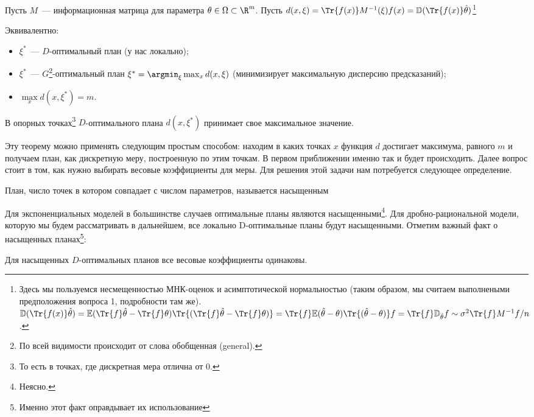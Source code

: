\begin{thm}
Пусть $M$ — информационная матрица для параметра $\theta \in \Omega \subset \R^m$.
Пусть $d(x,\xi) = \Tr{f(x)}M^{-1}(\xi)f(x) = \mathbb D(\Tr{f(x)}\hat{\theta})$\footnote{
    Здесь мы пользуемся несмещенностью МНК-оценок и асимптотической нормальностью (таким образом, мы считаем выполнеными предположения вопроса 1, подробности там же). $\mathbb D(\Tr{f(x)}\hat{\theta}) = \mathbb E(\Tr{f}\hat{\theta} - \Tr{f}\theta)\Tr{(\Tr{f}\hat{\theta} - \Tr{f}\theta)} = \Tr{f}\mathbb E(\hat{\theta} - \theta)\Tr{(\hat{\theta} - \theta)}f = \Tr{f}\mathbb D_{\hat{\theta}}f \sim  \sigma^2\Tr{f}M^{-1}f / n$.}


Эквивалентно:
\begin{itemize}
\item $\xi^{*}$ — $D$-оптимальный план (у нас локально);
\item $\xi^{*}$ — $G$\footnote{По всей видимости происходит от слова обобщенная (general).}-оптимальный план $\xi^{*} = \argmin_{\xi}\max_{x}d(x, \xi)$ (минимизирует максимальную дисперсию предсказаний);
\item $\max\limits_{x} d(x,\xi^{*}) = m$.
\end{itemize}
В опорных точках\footnote{То есть в точках, где дискретная мера отлична от 0.} $D$-оптимального плана  $d(x, \xi^{*})$ принимает свое максимальное значение.
\end{thm}

Эту теорему можно применять следующим простым способом: находим в каких точках $x$ функция $d$ достигает максимума, равного $m$ и получаем план, как дискретную меру, построенную по этим точкам.
В первом приближении именно так и будет происходить. Далее вопрос стоит в том, как нужно выбирать весовые коэффициенты для меры.
Для решения этой задачи нам потребуется следующее определение.

\begin{dfn}
План, число точек в котором совпадает с числом параметров, называется насыщенным
\end{dfn}

Для экспоненциальных моделей в большинстве случаев оптимальные планы являются насыщенными\footnote{\color{blue} Неясно.}.
Для дробно-рациональной модели, которую мы будем рассматривать в дальнейшем, все локально D-оптимальные планы будут насыщенными. Отметим важный факт о насыщенных планах\footnote{Именно этот факт оправдывает их использование}:
\begin{thm}
    Для насыщенных $D$-оптимальных планов все весовые коэффициенты одинаковы.
\end{thm}

